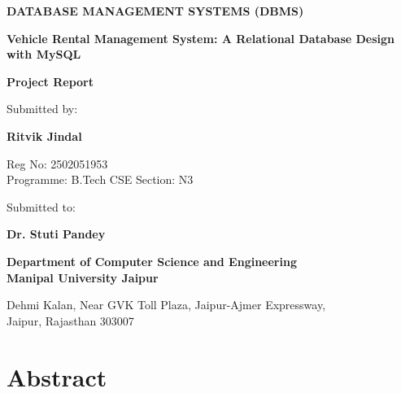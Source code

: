 \documentclass[10pt,a4paper]{report}
\begin{document}
\begin{titlepage}
  \centering
  \thispagestyle{empty}
  \vspace*{1.6cm}
  {\Large\bfseries DATABASE MANAGEMENT SYSTEMS (DBMS)\par}\vspace{1.0cm}

  {\Huge\bfseries Vehicle Rental Management System: A Relational Database Design with MySQL\par}
  \vspace{1.6cm}
  {\Large\bfseries Project Report\par}
  \vspace{1.9cm}

  {\large Submitted by:\par}
  \vspace{0.3cm}
  {\large\bfseries Ritvik Jindal\par}
  Reg No: 2502051953\\
  Programme: B.Tech CSE \hspace{1em} Section: N3
  \vspace{1.6cm}

  {\Large Submitted to:\par}
  \vspace{0.35cm}
  {\LARGE\bfseries Dr. Stuti Pandey\par}

  \vfill
  {\bfseries Department of Computer Science and Engineering\\
  Manipal University Jaipur\par}
  Dehmi Kalan, Near GVK Toll Plaza, Jaipur-Ajmer Expressway,\\
  Jaipur, Rajasthan 303007
\end{titlepage}

\chapter*{Abstract}
\end{document}
